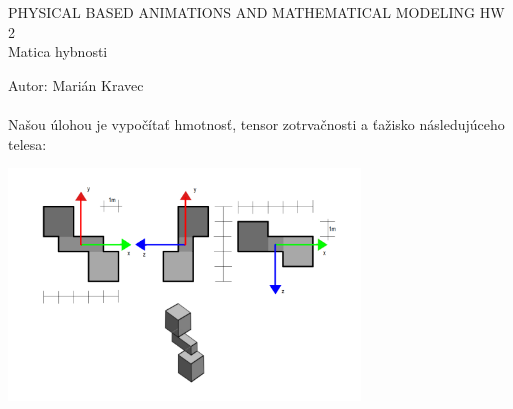 \documentclass[a4paper]{article}
\begin{document}
 
	
	\pagestyle{plain}
	
	\begin{center}
		\sc\large
		PHYSICAL BASED ANIMATIONS AND MATHEMATICAL MODELING HW 2 
		\\
		Matica hybnosti
	\end{center}

	Autor: Marián Kravec
	\\
	\\
	Našou úlohou je vypočítať hmotnosť, tensor zotrvačnosti a ťažisko následujúceho telesa:
	
	\centerline{\includegraphics[width=0.7\textwidth]{podorysy}} 
	
\end{document}

